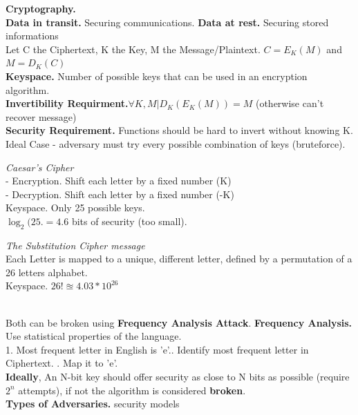 \documentclass[main.tex]{subfiles}
\begin{document}
\begin{minipage}[t]{0.495\textwidth}
	\vspace*{-7px}
	\textbf{Cryptography.}\\
	\textbf{Data in transit.} Securing communications. \textbf{Data at rest.} Securing stored informations\\
	Let C the Ciphertext, K the Key, M the Message/Plaintext.
	$C = E_K(M)$ and $M = D_K(C)$\\
	\textbf{Keyspace.} Number of possible keys that can be used in an encryption algorithm.\\
	\textbf{Invertibility Requirment.}$\forall K, M | D_K(E_K(M)) = M$ (otherwise can't recover message)\\
	\textbf{Security Requirement.} Functions should be hard to invert without knowing K.\\
	Ideal Case - adversary must try every possible combination of keys (bruteforce).\\[1px]
	\begin{minipage}[t]{0.6\textwidth}
		\textit{Caesar's Cipher}\\
		- Encryption. Shift each letter by a fixed number (K)\\
		- Decryption. Shift each letter by a fixed number (-K)\\
		Keyspace. Only 25 possible keys. \\$\log_{2}(25.=4.6$ bits of security (too small).
	\end{minipage}
	\begin{minipage}[t]{0.4\textwidth}
		\textit{The Substitution Cipher message}\\
		Each Letter is mapped to a unique, different letter, defined by a permutation of a 26 letters alphabet.\\
		Keyspace. $26! \approxeq 4.03*10^{26}$
	\end{minipage}\\
	Both can be broken using \textbf{Frequency Analysis Attack}.
	\hline
	\textbf{Frequency Analysis.} Use statistical properties of the language.\\
	1. Most frequent letter in English is 'e'.. Identify most frequent letter in Ciphertext. . Map it to 'e'.\\
	\textbf{Ideally}, An N-bit key should offer security as close to N bits as possible (require $2^n$ attempts), if not the algorithm is considered \textbf{broken}.\\
	\textbf{Types of Adversaries.} security models
	\begin{itemize}

\end{itemize}
\end{minipage}
\end{document}
